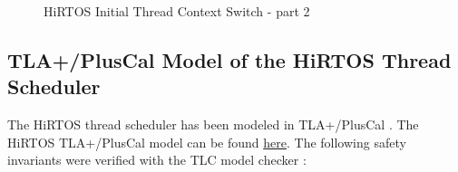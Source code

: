 \documentclass[11pt,letterpaper,twoside,openany]{book}
\begin{document}
\begin{figure}[H]
   \centering
   \scalebox{0.40} {
      
   }
   \caption{HiRTOS Initial Thread Context Switch - part 2}
   \label{HiRTOSumlSeqDiagram6}
\end{figure}

\subsection{TLA+/PlusCal Model of the HiRTOS Thread Scheduler}

The HiRTOS thread scheduler has been modeled in TLA+/PlusCal \cite{tla1, tla2}.
The HiRTOS TLA+/PlusCal model can be found \href{run:./tla_models/HiRTOS.pdf}{here}.
The following safety invariants were verified with the TLC model checker \cite{tlc}:
\end{document}
